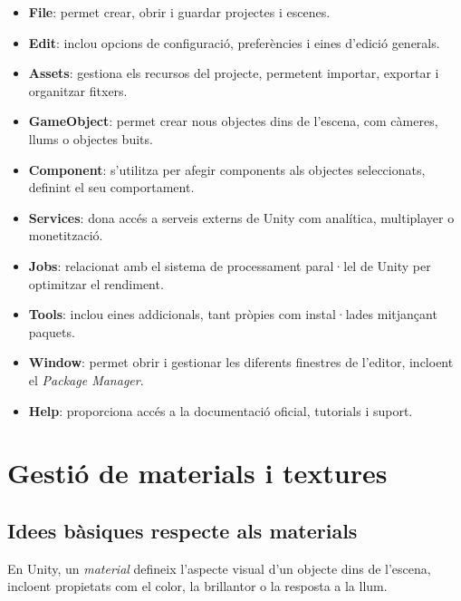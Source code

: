 \documentclass[12pt,a4paper]{report}
\begin{document}
\begin{itemize}

\item \textbf{File}: permet crear, obrir i guardar projectes i escenes.

\item \textbf{Edit}: inclou opcions de configuració, preferències i eines d'edició generals.

\item \textbf{Assets}: gestiona els recursos del projecte, permetent importar, exportar i organitzar fitxers.

\item \textbf{GameObject}: permet crear nous objectes dins de l'escena, com càmeres, llums o objectes buits.

\item \textbf{Component}: s'utilitza per afegir components als objectes seleccionats, definint el seu comportament.

\item \textbf{Services}: dona accés a serveis externs de Unity com analítica, multiplayer o monetització.

\item \textbf{Jobs}: relacionat amb el sistema de processament paral·lel de Unity per optimitzar el rendiment.

\item \textbf{Tools}: inclou eines addicionals, tant pròpies com instal·lades mitjançant paquets.

\item \textbf{Window}: permet obrir i gestionar les diferents finestres de l'editor, incloent el \textit{Package Manager}.

\item \textbf{Help}: proporciona accés a la documentació oficial, tutorials i suport.

\end{itemize}

\section{Gestió de materials i textures}

\subsection{Idees bàsiques respecte als materials}

En Unity, un \textit{material} defineix l'aspecte visual d'un objecte dins de l'escena, incloent propietats com el color, la brillantor o la resposta a la llum. \cite{UnityMaterialsIntro}
\end{document}
